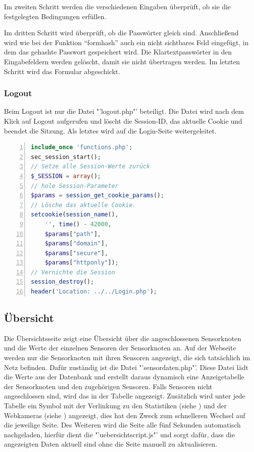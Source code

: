 Im zweiten Schritt werden die verschiedenen Eingaben überprüft, ob sie die festgelegten Bedingungen erfüllen. 

Im dritten Schritt wird überprüft, ob die Passwörter gleich sind. Anschließend wird wie bei der Funktion "`formhash"' auch ein nicht sichtbares Feld eingefügt, in dem das gehashte Passwort gespeichert wird. Die Klartextpasswörter in den Eingabefeldern werden gelöscht, damit sie nicht übertragen werden. Im letzten Schritt wird das Formular abgeschickt.

\subsubsection{Logout}
Beim Logout ist nur die Datei "'logout.php"' beteiligt. Die Datei wird nach dem Klick auf Logout aufgerufen und löscht die Session-ID, das aktuelle Cookie und beendet die Sitzung. Als letztes wird auf die Login-Seite weitergeleitet.

\begin{lstlisting}[caption=Inhalt der logout.php,frame=single,numbers=left,language=PHP]
include_once 'functions.php';
sec_session_start();
// Setze alle Session-Werte zurück
$_SESSION = array();
// hole Session-Parameter
$params = session_get_cookie_params();
// Lösche das aktuelle Cookie.
setcookie(session_name(),
    '', time() - 42000,
    $params["path"],
    $params["domain"],
    $params["secure"],
    $params["httponly"]);
// Vernichte die Session
session_destroy();
header('Location: ../../Login.php');
\end{lstlisting}

\subsection{Übersicht}\label{Uebersicht}
Die Übersichtsseite zeigt eine Übersicht über die angeschlossenen Sensorknoten und die Werte der einzelnen Sensoren der Sensorknoten an. Auf der Webseite werden nur die Sensorknoten mit ihren Sensoren angezeigt, die sich tatsächlich im Netz befinden. Dafür zuständig ist die Datei "'sensordaten.php"'. Diese Datei lädt die Werte aus der Datenbank und erstellt daraus dynamisch eine Anzeigetabelle der Sensorknoten und den zugehörigen Sensoren. Falls Sensoren nicht angeschlossen sind, wird das in der Tabelle angezeigt. Zusätzlich wird unter jede Tabelle ein Symbol mit der Verlinkung zu den Statistiken (siehe ) und der Webkameras (siehe ) angezeigt, dies hat den Zweck zum schnelleren Wechsel auf die jeweilige Seite. Des Weiteren wird die Seite alle fünf Sekunden automatisch nachgeladen, hierfür dient die "'uebersichtscript.js"' und sorgt dafür, dass die angezeigten Daten aktuell sind ohne die Seite manuell zu aktualisieren.

